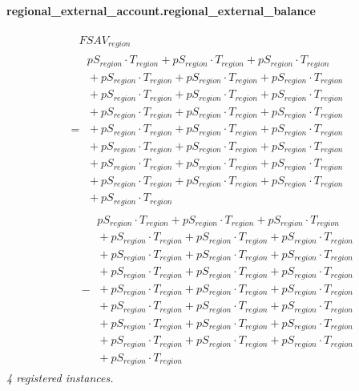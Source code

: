 \documentclass[11pt]{article}
\begin{document}
\paragraph{regional\_external\_account.regional\_external\_balance}
\begin{align*}
&\quad FSAV_{region}\\
&= \begin{aligned}
pS_{region} \cdot T_{region} + pS_{region} \cdot T_{region} + pS_{region} \cdot T_{region}\\
{}+ pS_{region} \cdot T_{region} + pS_{region} \cdot T_{region} + pS_{region} \cdot T_{region}\\
{}+ pS_{region} \cdot T_{region} + pS_{region} \cdot T_{region} + pS_{region} \cdot T_{region}\\
{}+ pS_{region} \cdot T_{region} + pS_{region} \cdot T_{region} + pS_{region} \cdot T_{region}\\
{}+ pS_{region} \cdot T_{region} + pS_{region} \cdot T_{region} + pS_{region} \cdot T_{region}\\
{}+ pS_{region} \cdot T_{region} + pS_{region} \cdot T_{region} + pS_{region} \cdot T_{region}\\
{}+ pS_{region} \cdot T_{region} + pS_{region} \cdot T_{region} + pS_{region} \cdot T_{region}\\
{}+ pS_{region} \cdot T_{region} + pS_{region} \cdot T_{region} + pS_{region} \cdot T_{region}\\
{}+ pS_{region} \cdot T_{region}
\end{aligned}\\
&\quad {}- \begin{aligned}
pS_{region} \cdot T_{region} + pS_{region} \cdot T_{region} + pS_{region} \cdot T_{region}\\
{}+ pS_{region} \cdot T_{region} + pS_{region} \cdot T_{region} + pS_{region} \cdot T_{region}\\
{}+ pS_{region} \cdot T_{region} + pS_{region} \cdot T_{region} + pS_{region} \cdot T_{region}\\
{}+ pS_{region} \cdot T_{region} + pS_{region} \cdot T_{region} + pS_{region} \cdot T_{region}\\
{}+ pS_{region} \cdot T_{region} + pS_{region} \cdot T_{region} + pS_{region} \cdot T_{region}\\
{}+ pS_{region} \cdot T_{region} + pS_{region} \cdot T_{region} + pS_{region} \cdot T_{region}\\
{}+ pS_{region} \cdot T_{region} + pS_{region} \cdot T_{region} + pS_{region} \cdot T_{region}\\
{}+ pS_{region} \cdot T_{region} + pS_{region} \cdot T_{region} + pS_{region} \cdot T_{region}\\
{}+ pS_{region} \cdot T_{region}
\end{aligned}
\end{align*}
\noindent\emph{4 registered instances.}\par
\end{document}
